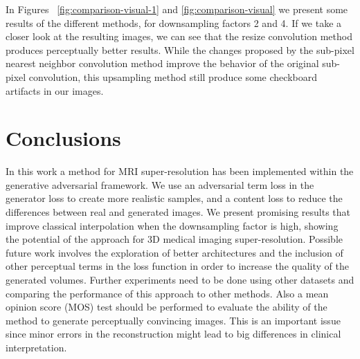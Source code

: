 \documentclass{article}
\begin{document}
In Figures ~\ref{fig:comparison-visual-1} and \ref{fig:comparison-visual} we present some results of the different methods, for downsampling factors 2 and 4. If we take a closer look at the resulting images, we can see that the resize convolution method produces perceptually better results. While the changes proposed by the sub-pixel nearest neighbor convolution method improve the behavior of the original sub-pixel convolution, this upsampling method still produce some checkboard artifacts in our images.

\section{Conclusions}
\label{sec:foot}

In this work a method for MRI super-resolution has been implemented within the generative adversarial framework.
We use an adversarial term loss in the generator loss to create more realistic samples, and a content loss to reduce the differences between real and generated images.
We present promising results that improve classical interpolation when the downsampling factor is high, showing the potential of the approach for 3D medical imaging super-resolution.
Possible future work involves the exploration of better architectures and the inclusion of other perceptual terms in the loss function in order to increase the quality of the generated volumes. Further experiments need to be done using other datasets and comparing the performance of this approach to other methods. Also a mean opinion score (MOS) test should be performed to evaluate the ability of the method to generate perceptually convincing images. This is an important issue since minor errors in the reconstruction might lead to big differences in clinical interpretation.


\end{document}
